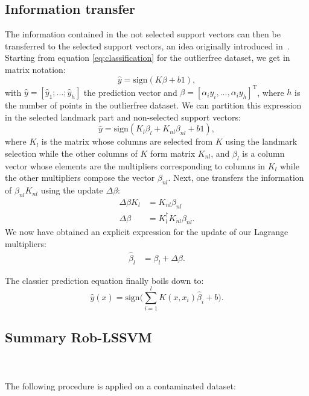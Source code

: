 \documentclass[preprint,12pt]{elsarticle}
\begin{document}
	\subsection{Information transfer}
	The information contained in the not selected support vectors can then be transferred to the selected support vectors, an idea originally introduced in~\cite{tao2009fast}. Starting from equation \eqref{eq:classification} for the outlierfree dataset, we get in matrix notation:
	\begin{equation}
\hat{y} = \mathrm{sign}(K\beta  + b 1),
	\end{equation}
with $\hat{y} = [\hat{y}_1;...;\hat{y}_h]$ the prediction vector and $\beta = [\alpha_i y_i ,...,\alpha_i y_{h}]^\mathrm{T}$, where $h$ is the number of points in the outlierfree dataset.
We can partition this expression in the selected landmark part and non-selected support vectors:
	\begin{equation}
\hat{y} = \mathrm{sign}(K_l\beta_l + K_{nl}\beta_{nl}  + b 1),
	\end{equation}
	where $K_l $ is the matrix whose columns are selected from $K$ using the landmark selection while the other columns of $K$ form matrix $K_{nl}$, and $\beta_l$ is a column vector whose elements are the multipliers corresponding to columns in $K_l $ while the other multipliers compose the vector $ \beta_{nl}$.
	Next, one transfers the information of $\beta_{nl} K_{nl}$ using the update $\Delta\beta$: 
	\begin{align}
	\Delta \beta K_l &= K_{nl} \beta_{nl}   \\
	\Delta \beta &= K^\dagger_l  K_{nl} \beta_{nl} .
	\end{align}
	We now have obtained an explicit expression for the update of our Lagrange multipliers:
	\begin{align}
	\hat{\beta}_l &=\beta_l + \Delta \beta.
	\end{align}

	
 The classier prediction equation finally boils down to:
	\begin{equation}
\hat{y}(x) = \mathrm{sign}\Big(\sum_{i=1}^{l} K(x, x_i)\hat{\beta}_i  + b\Big).	
	\end{equation}
	
	\subsection{Summary Rob-LSSVM} 
	\hfill \\\\
	The following procedure is applied on a contaminated dataset:
	
\end{document}
